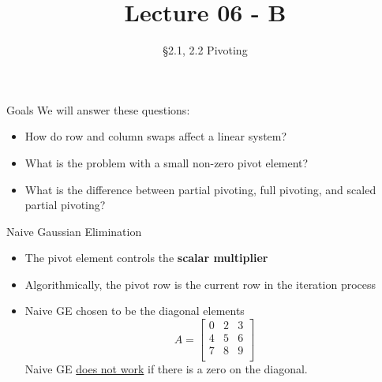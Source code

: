 \documentclass[10pt]{beamer}
\title[Math/CS 375]{Lecture 06 - B}
\subtitle{\S 2.1, 2.2 Pivoting}
\begin{document}
\begin{frame}
  \titlepage
\end{frame}

\begin{frame}{Goals}
We will answer these questions:\\[3mm]
\begin{itemize}
    \item How do row and column swaps affect a linear system?
    \item What is the problem with a small non-zero pivot element? 
    \item What is the difference between partial pivoting, full pivoting, and scaled partial pivoting?
\end{itemize}
\end{frame}


\begin{frame}{Naive Gaussian Elimination}

{
}

\bigskip

\begin{itemize}
    \item The pivot element controls the \textbf{scalar multiplier }
    
    \item Algorithmically, the pivot row is the current row in the iteration process


\item Naive GE chosen to be the diagonal elements 
\begin{equation*}
A=
\begin{bmatrix}
  \boxed{0} & 2 & 3\\
  4 & \boxed{5} & 6\\
  7 & 8 & 9\\
\end{bmatrix}
\end{equation*}
Naive GE \underline{does not work} if there is a zero on the diagonal.

\end{itemize}
\end{frame}

\end{document}
